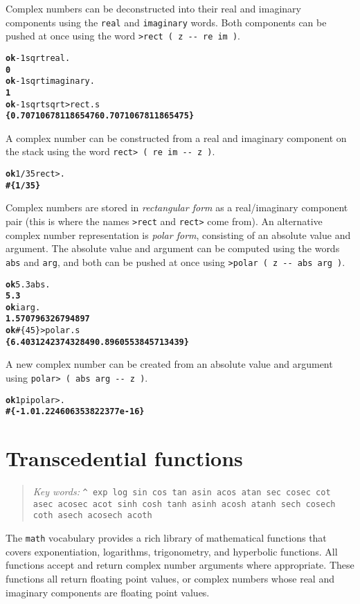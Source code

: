 \documentclass[english]{book}
\newcommand{\chapkeywords}[1]{%
\begin{quote}
\emph{Key words:} \texttt{#1}
\end{quote}
}
\begin{document}
Complex numbers can be deconstructed into their real and imaginary components using the \texttt{real} and \texttt{imaginary} words. Both components can be pushed at once using the word \texttt{>rect ( z -{}- re im )}.

\begin{alltt}
\textbf{ok} -1 sqrt real .
\textbf{0}
\textbf{ok} -1 sqrt imaginary .
\textbf{1}
\textbf{ok} -1 sqrt sqrt >rect .s
\textbf{\{ 0.7071067811865476 0.7071067811865475 \}}
\end{alltt}

A complex number can be constructed from a real and imaginary component on the stack using the word \texttt{rect> ( re im -{}- z )}.

\begin{alltt}
\textbf{ok} 1/3 5 rect> .
\textbf{\#\{ 1/3 5 \}}
\end{alltt}

Complex numbers are stored in \emph{rectangular form} as a real/imaginary component pair (this is where the names \texttt{>rect} and \texttt{rect>} come from). An alternative complex number representation is \emph{polar form}, consisting of an absolute value and argument. The absolute value and argument can be computed using the words \texttt{abs} and \texttt{arg}, and both can be pushed at once using \texttt{>polar ( z -{}- abs arg )}.

\begin{alltt}
\textbf{ok} 5.3 abs .
\textbf{5.3}
\textbf{ok} i arg .
\textbf{1.570796326794897}
\textbf{ok} \#\{ 4 5 \} >polar .s
\textbf{\{ 6.403124237432849 0.8960553845713439 \}}
\end{alltt}

A new complex number can be created from an absolute value and argument using \texttt{polar> ( abs arg -{}- z )}.

\begin{alltt}
\textbf{ok} 1 pi polar> .
\textbf{\#\{ -1.0 1.224606353822377e-16 \}}
\end{alltt}

\section{Transcedential functions}

\chapkeywords{\^{} exp log sin cos tan asin acos atan sec cosec cot asec acosec acot sinh cosh tanh asinh acosh atanh sech cosech coth asech acosech acoth}

The \texttt{math} vocabulary provides a rich library of mathematical functions that covers exponentiation, logarithms, trigonometry, and hyperbolic functions. All functions accept and return complex number arguments where appropriate. These functions all return floating point values, or complex numbers whose real and imaginary components are floating point values.
\end{document}
